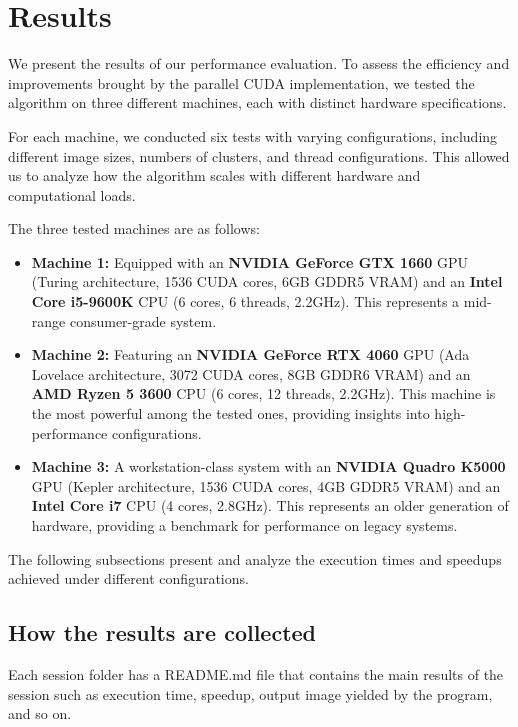 \chapter{Results}

We present the results of our performance evaluation. To assess the efficiency and improvements brought by the parallel CUDA implementation, we tested the algorithm on three different machines, each with distinct hardware specifications. 

For each machine, we conducted six tests with varying configurations, including different image sizes, numbers of clusters, and thread configurations. This allowed us to analyze how the algorithm scales with different hardware and computational loads.

The three tested machines are as follows:

\begin{itemize}
    \item \textbf{Machine 1:} Equipped with an \textbf{NVIDIA GeForce GTX 1660} GPU (Turing architecture, 1536 CUDA cores, 6GB GDDR5 VRAM) and an \textbf{Intel Core i5-9600K} CPU (6 cores, 6 threads, 2.2GHz). This represents a mid-range consumer-grade system.
    
    \item \textbf{Machine 2:} Featuring an \textbf{NVIDIA GeForce RTX 4060} GPU (Ada Lovelace architecture, 3072 CUDA cores, 8GB GDDR6 VRAM) and an \textbf{AMD Ryzen 5 3600} CPU (6 cores, 12 threads, 2.2GHz). This machine is the most powerful among the tested ones, providing insights into high-performance configurations.

    \item \textbf{Machine 3:} A workstation-class system with an \textbf{NVIDIA Quadro K5000} GPU (Kepler architecture, 1536 CUDA cores, 4GB GDDR5 VRAM) and an \textbf{Intel Core i7} CPU (4 cores, 2.8GHz). This represents an older generation of hardware, providing a benchmark for performance on legacy systems.
\end{itemize}

The following subsections present and analyze the execution times and speedups achieved under different configurations.

\section{How the results are collected}
Each session folder has a README.md file that contains the main results of the session such as execution time, speedup, output image yielded by the program, and so on.


